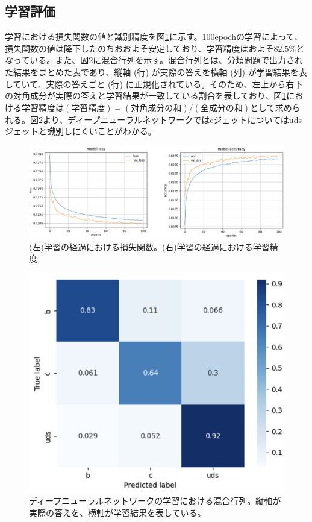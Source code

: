 \subsection{学習評価}
学習における損失関数の値と識別精度を図\ref{dnnoutput}に示す。100epochの学習によって、損失関数の値は降下したのちおおよそ安定しており、学習精度はおよそ$82.5\%$となっている。また、図\ref{dnncm}に混合行列を示す。混合行列とは、分類問題で出力された結果をまとめた表であり、縦軸 (行) が実際の答えを横軸 (列) が学習結果を表していて、実際の答えごと (行) に正規化されている。そのため、左上から右下の対角成分が実際の答えと学習結果が一致している割合を表しており、図\ref{dnnoutput}における学習精度は$(学習精度) = (対角成分の和) / (全成分の和)$として求められる。図\ref{dnncm}より、ディープニューラルネットワークではcジェットについてはudsジェットと識別しにくいことがわかる。\\
\begin{figure}[H]
	\begin{center}
 \includegraphics[keepaspectratio, scale=0.3]
 	{Figure/Flavortagging/dnnout.png}
 		\caption{(左)学習の経過における損失関数。(右)学習の経過における学習精度}
 		\label{dnnoutput}
	\end{center}
\end{figure}
\begin{figure}[H]
	\begin{center}
 \includegraphics[keepaspectratio, scale=0.2]
 	{Figure/Flavortagging/dnncm.png}
 		\caption{ディープニューラルネットワークの学習における混合行列。縦軸が実際の答えを、横軸が学習結果を表している。}
 		\label{dnncm}
	\end{center}
\end{figure}
